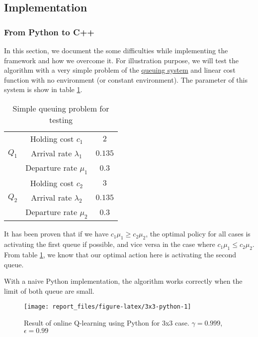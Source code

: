\documentclass[
  a4paper, xcolor = usenames,dvipsnames]{article}
\begin{document}
\hypertarget{implementation}{%
\subsection{Implementation}\label{implementation}}

\hypertarget{from-python-to-c}{%
\subsubsection{From Python to C++}\label{from-python-to-c}}

In this section, we document the some difficulties while implementing the framework and how we overcome it. For illustration purpose, we will test the algorithm with a very simple problem of the \protect\hyperlink{queuing-system}{queuing system}
and linear cost function with no environment (or constant environment). The parameter of this system is show in table \ref{tab:q-learning-test}.

\begin{table}[ht]
\caption{Simple queuing problem for testing}
\begin{center}
\begin{tabular}{c c c}
    \hline
    \multirow{3}{*}{$Q_{1}$} & Holding cost $c_{1}$ & $2$ \\
    & Arrival rate $\lambda_{1}$ & $0.135$ \\
    & Departure rate $\mu_{1}$ & $0.3$ \\
    \cline{2-3}
    \multirow{3}{*}{$Q_{2}$} & Holding cost $c_{2}$ & $3$ \\
    & Arrival rate $\lambda_{2}$ & $0.135$ \\
    & Departure rate $\mu_{2}$ & $0.3$ \\    
    \hline
\end{tabular}
\end{center}
\label{tab:q-learning-test}
\end{table}

It has been proven that if we have \(c_{1} \mu_{1} \ge c_{2} \mu_{2}\), the optimal policy for all cases is activating the first queue if possible, and vice versa in the case where \(c_{1} \mu_{1} \le c_{2} \mu_{2}\). From table \ref{tab:q-learning-test}, we know that our optimal action here is activating the second queue.

With a naive Python implementation, the algorithm works correctly when the limit of both queue are small.

\begin{figure}

{\centering \texttt{[image: report\_files/figure-latex/3x3-python-1]} 

}

\caption{Result of online Q-learning using Python for 3x3 case. $\gamma = 0.999$, $\epsilon = 0.99$}\label{fig:3x3-python}
\end{figure}
\end{document}
